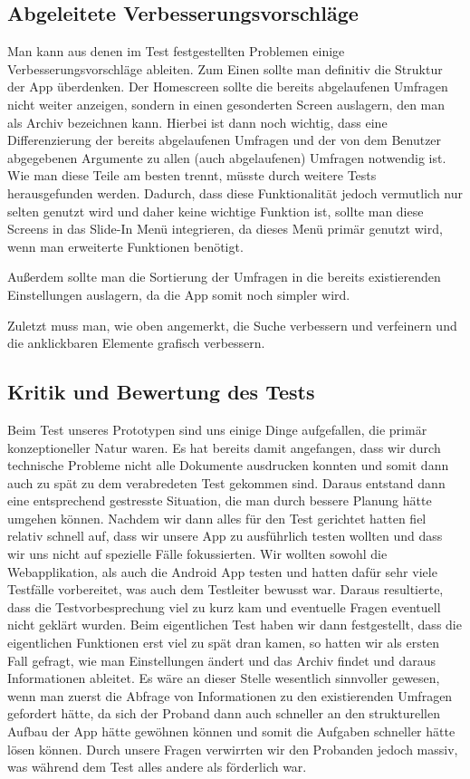 \subsection{Abgeleitete Verbesserungsvorschläge}
\label{sec:verbesserungsvorschlaege}

Man kann aus denen im Test festgestellten Problemen einige Verbesserungsvorschläge ableiten. Zum Einen sollte man definitiv die Struktur der App überdenken. Der Homescreen sollte die bereits abgelaufenen Umfragen nicht weiter anzeigen, sondern in einen gesonderten Screen auslagern, den man als Archiv bezeichnen kann. Hierbei ist dann noch wichtig, dass eine Differenzierung der bereits abgelaufenen Umfragen und der von dem Benutzer abgegebenen Argumente zu allen (auch abgelaufenen) Umfragen notwendig ist. Wie man diese Teile am besten trennt, müsste durch weitere Tests herausgefunden werden. Dadurch, dass diese Funktionalität jedoch vermutlich nur selten genutzt wird und daher keine wichtige Funktion ist, sollte man diese Screens in das Slide-In Menü integrieren, da dieses Menü primär genutzt wird, wenn man erweiterte Funktionen benötigt.

Außerdem sollte man die Sortierung der Umfragen in die bereits existierenden Einstellungen auslagern, da die App somit noch simpler wird.

Zuletzt muss man, wie oben angemerkt, die Suche verbessern und verfeinern und die anklickbaren Elemente grafisch verbessern.

\subsection{Kritik und Bewertung des Tests}
\label{sec:kritik}

Beim Test unseres Prototypen sind uns einige Dinge aufgefallen, die primär konzeptioneller Natur waren. Es hat bereits damit angefangen, dass wir durch technische Probleme nicht alle Dokumente ausdrucken konnten und somit dann auch zu spät zu dem verabredeten Test gekommen sind. Daraus entstand dann eine entsprechend gestresste Situation, die man durch bessere Planung hätte umgehen können. 
Nachdem wir dann alles für den Test gerichtet hatten fiel relativ schnell auf, dass wir unsere App zu ausführlich testen wollten und dass wir uns nicht auf spezielle Fälle fokussierten. Wir wollten sowohl die Webapplikation, als auch die Android App testen und hatten dafür sehr viele Testfälle vorbereitet, was auch dem Testleiter bewusst war. Daraus resultierte, dass die Testvorbesprechung viel zu kurz kam und eventuelle Fragen eventuell nicht geklärt wurden.
Beim eigentlichen Test haben wir dann festgestellt, dass die eigentlichen Funktionen erst viel zu spät dran kamen, so hatten wir als ersten Fall gefragt, wie man Einstellungen ändert und das Archiv findet und daraus Informationen ableitet. Es wäre an dieser Stelle wesentlich sinnvoller gewesen, wenn man zuerst die Abfrage von Informationen zu den existierenden Umfragen gefordert hätte, da sich der Proband dann auch schneller an den strukturellen Aufbau der App hätte gewöhnen können und somit die Aufgaben schneller hätte lösen können. Durch unsere Fragen verwirrten wir den Probanden jedoch massiv, was während dem Test alles andere als förderlich war.

